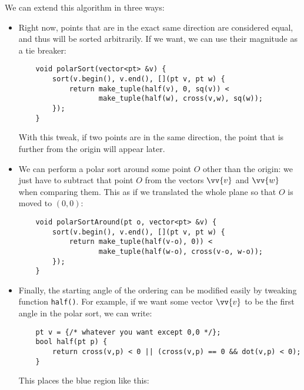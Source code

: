 We can extend this algorithm in three ways:
\begin{itemize}
    \item Right now, points that are in the exact same direction are considered equal, and thus will be sorted arbitrarily. If we want, we can use their magnitude as a tie breaker:
    \begin{lstlisting}
    void polarSort(vector<pt> &v) {
        sort(v.begin(), v.end(), [](pt v, pt w) {
            return make_tuple(half(v), 0, sq(v)) <
                   make_tuple(half(w), cross(v,w), sq(w));
        });
    }
    \end{lstlisting}
    With this tweak, if two points are in the same direction, the point that is further from the origin will appear later.
    \item We can perform a polar sort around some point $O$ other than the origin: we just have to subtract that point $O$ from the vectors $\vv{v}$ and $\vv{w}$ when comparing them. This as if we translated the whole plane so that $O$ is moved to $(0,0)$:
    \begin{lstlisting}
    void polarSortAround(pt o, vector<pt> &v) {
        sort(v.begin(), v.end(), [](pt v, pt w) {
            return make_tuple(half(v-o), 0)) <
                   make_tuple(half(w-o), cross(v-o, w-o));
        });
    }
    \end{lstlisting}
    \item Finally, the starting angle of the ordering can be modified easily by tweaking function \lstinline|half()|. For example, if we want some vector $\vv{v}$ to be the first angle in the polar sort, we can write:
    \begin{lstlisting}
    pt v = {/* whatever you want except 0,0 */};
    bool half(pt p) {
        return cross(v,p) < 0 || (cross(v,p) == 0 && dot(v,p) < 0);
    }
    \end{lstlisting}
    This places the blue region like this:
\end{itemize}
